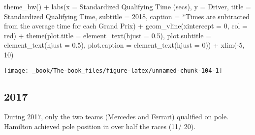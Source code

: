 \documentclass[
]{book}
\newenvironment{Shaded}{\begin{snugshade}}{\end{snugshade}}
\newcommand{\AttributeTok}[1]{\textcolor[rgb]{0.77,0.63,0.00}{#1}}
\newcommand{\DecValTok}[1]{\textcolor[rgb]{0.00,0.00,0.81}{#1}}
\newcommand{\FloatTok}[1]{\textcolor[rgb]{0.00,0.00,0.81}{#1}}
\newcommand{\FunctionTok}[1]{\textcolor[rgb]{0.00,0.00,0.00}{#1}}
\newcommand{\NormalTok}[1]{#1}
\newcommand{\SpecialCharTok}[1]{\textcolor[rgb]{0.00,0.00,0.00}{#1}}
\newcommand{\StringTok}[1]{\textcolor[rgb]{0.31,0.60,0.02}{#1}}
\begin{document}
\begin{Shaded}
\begin{Highlighting}[]
  \FunctionTok{theme\_bw}\NormalTok{() }\SpecialCharTok{+}
  \FunctionTok{labs}\NormalTok{(}\AttributeTok{x =} \StringTok{\textquotesingle{}Standardized Qualifying Time (secs)\textquotesingle{}}\NormalTok{,}
       \AttributeTok{y =} \StringTok{\textquotesingle{}Driver\textquotesingle{}}\NormalTok{,}
       \AttributeTok{title =} \StringTok{\textquotesingle{}Standardized Qualifying Time\textquotesingle{}}\NormalTok{,}
       \AttributeTok{subtitle =} \StringTok{\textquotesingle{}2018\textquotesingle{}}\NormalTok{,}
       \AttributeTok{caption =} \StringTok{\textquotesingle{}*Times are subtracted from the average time for each Grand Prix\textquotesingle{}}\NormalTok{) }\SpecialCharTok{+}
  \FunctionTok{geom\_vline}\NormalTok{(}\AttributeTok{xintercept =} \DecValTok{0}\NormalTok{, }\AttributeTok{col =} \StringTok{\textquotesingle{}red\textquotesingle{}}\NormalTok{) }\SpecialCharTok{+}
  \FunctionTok{theme}\NormalTok{(}\AttributeTok{plot.title =} \FunctionTok{element\_text}\NormalTok{(}\AttributeTok{hjust =} \FloatTok{0.5}\NormalTok{),}
        \AttributeTok{plot.subtitle =} \FunctionTok{element\_text}\NormalTok{(}\AttributeTok{hjust =} \FloatTok{0.5}\NormalTok{),}
        \AttributeTok{plot.caption =} \FunctionTok{element\_text}\NormalTok{(}\AttributeTok{hjust =} \DecValTok{0}\NormalTok{)) }\SpecialCharTok{+}
  \FunctionTok{xlim}\NormalTok{(}\SpecialCharTok{{-}}\DecValTok{5}\NormalTok{, }\DecValTok{10}\NormalTok{)}
\end{Highlighting}
\end{Shaded}

\begin{center}\texttt{[image: \_book/The-book\_files/figure-latex/unnamed-chunk-104-1]} \end{center}

\hypertarget{section-6}{%
\subsection{2017}\label{section-6}}

During 2017, only the two teams (Mercedes and Ferrari) qualified on pole. Hamilton achieved pole position in over half the races (11/ 20).
\end{document}
